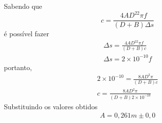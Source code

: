 Sabendo que
\begin{equation}
	c = \frac{4AD^22\pi f}{(D+B)\Delta s}
\end{equation}
é possível fazer
\begin{equation}
\begin{split}
	\Delta s = \frac{4AD^22\pi f}{(D+B)c}\\
	\Delta s = 2\times10^{-10}f
\end{split}
\end{equation}
portanto,
\begin{equation}
\begin{split}
	2\times10^{-10}=\frac{8AD^2\pi}{(D+B)c}\\
	c=\frac{8AD^2\pi}{(D+B)2\times10^{-10}}
\end{split}
\end{equation}
Substituindo os valores obtidos
\begin{equation}
	\begin{split}
		A = 0,261 m \pm 0,0
	\end{split}
\end{equation}
